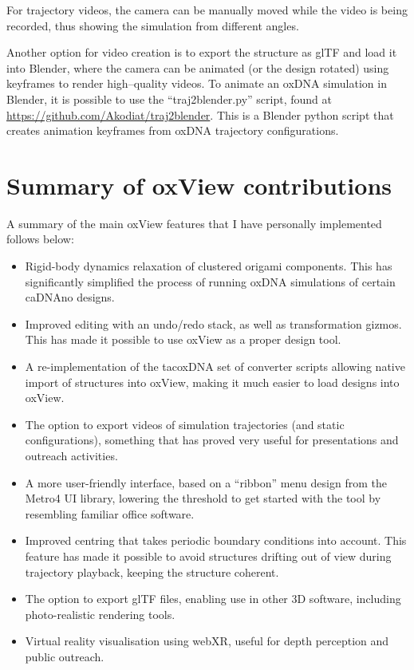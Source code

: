 For trajectory videos, the camera can be manually moved while the video is being recorded, thus showing the simulation from different angles.

Another option for video creation is to export the structure as glTF and load it into Blender, where the camera can be animated (or the design rotated) using keyframes to render high--quality videos. To animate an oxDNA simulation in Blender, it is possible to use the ``traj2blender.py'' script, found at \url{https://github.com/Akodiat/traj2blender}. This is a Blender python script that creates animation keyframes from oxDNA trajectory configurations.

\section{Summary of oxView contributions}

A summary of the main oxView features that I have personally implemented follows below:
\begin{itemize}
  \item Rigid-body dynamics relaxation of clustered origami components. This has significantly simplified the process of running oxDNA simulations of certain caDNAno designs.
  \item Improved editing with an undo/redo stack, as well as transformation gizmos. This has made it possible to use oxView as a proper design tool.
  \item A re-implementation of the tacoxDNA set of converter scripts allowing native import of structures into oxView, making it much easier to load designs into oxView.
  \item The option to export videos of simulation trajectories (and static configurations), something that has proved very useful for presentations and outreach activities.
  \item A more user-friendly interface, based on a ``ribbon'' menu design from the Metro4 UI library, lowering the threshold to get started with the tool by resembling familiar office software.
  \item Improved centring that takes periodic boundary conditions into account. This feature has made it possible to avoid structures drifting out of view during trajectory playback, keeping the structure coherent.
  \item The option to export glTF files, enabling use in other 3D software, including photo-realistic rendering tools.
  \item Virtual reality visualisation using webXR, useful for depth perception and public outreach.
\end{itemize}



